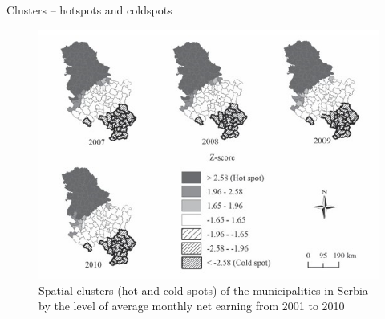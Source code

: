 \documentclass{beamer}
\begin{document}
\begin{frame}{Clusters -- hotspots and coldspots}
\begin{figure}
	\includegraphics[width=.7\textwidth]{IMG/sp_coldspot.PNG}
	\caption{Spatial clusters (hot and cold spots) of the municipalities in Serbia by the level of average monthly net earning from 2001 to 2010}
\end{figure}
\end{frame}































\end{document}
